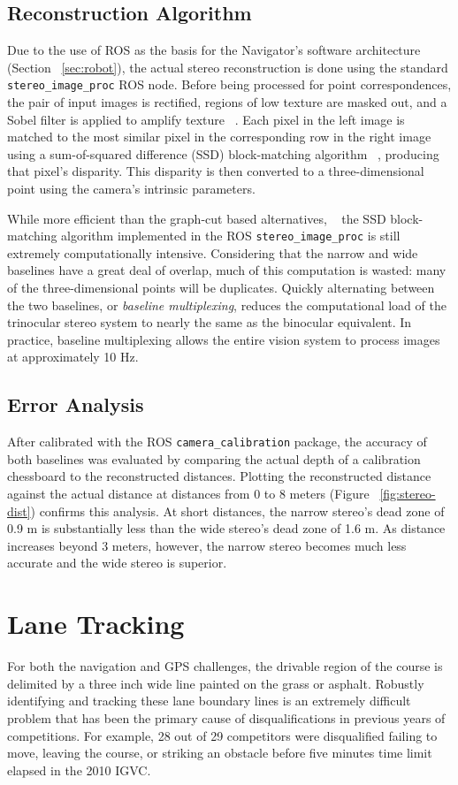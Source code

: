\documentclass[twocolumn,11pt]{article}
\begin{document}
\subsection{Reconstruction Algorithm}
\label{sec:stereo-algo}
Due to the use of ROS as the basis for the Navigator's software architecture
(Section ~\ref{sec:robot}), the actual stereo reconstruction is done using the
standard \texttt{stereo\_image\_proc} ROS node. Before being processed for
point correspondences, the pair of input images is rectified, regions of low
texture are masked out, and a Sobel filter is applied to amplify texture
~\cite{stereo}. Each pixel in the left image is matched to the most similar
pixel in the corresponding row in the right image using a sum-of-squared
difference (SSD) block-matching algorithm ~\cite{stereo}, producing that
pixel's disparity. This disparity is then converted to a three-dimensional point
using the camera's intrinsic parameters.

While more efficient than the graph-cut based alternatives, ~\cite{stereo} the
SSD block-matching algorithm implemented in the ROS
\texttt{stereo\_image\_proc} is still extremely computationally intensive.
Considering that the narrow and wide baselines have a great deal of overlap,
much of this computation is wasted: many of the three-dimensional points will
be duplicates. Quickly alternating between the two baselines, or
\textit{baseline multiplexing}, reduces the computational load of the
trinocular stereo system to nearly the same as the binocular equivalent. In
practice, baseline multiplexing allows the entire vision system to process
images at approximately 10 Hz.

\subsection{Error Analysis}
\label{sec:stereo-error}
After calibrated with the ROS \texttt{camera\_calibration} package, the
accuracy of both baselines was evaluated by comparing the actual depth of a
calibration chessboard to the reconstructed distances. Plotting the
reconstructed distance against the actual distance at distances from 0 to 8
meters (Figure ~\ref{fig:stereo-dist}) confirms this analysis. At short
distances, the narrow stereo's dead zone of 0.9 m is substantially less than
the wide stereo's dead zone of 1.6 m. As distance increases beyond 3 meters,
however, the narrow stereo becomes much less accurate and the wide stereo is
superior.

\section{Lane Tracking}
\label{sec:line}
For both the navigation and GPS challenges, the drivable region of the course
is delimited by a three inch wide line painted on the grass or asphalt.
Robustly identifying and tracking these lane boundary lines is an extremely
difficult problem that has been the primary cause of disqualifications in
previous years of competitions. For example, 28 out of 29 competitors were
disqualified failing to move, leaving the course, or striking an obstacle
before five minutes time limit elapsed in the 2010 IGVC.
\end{document}

